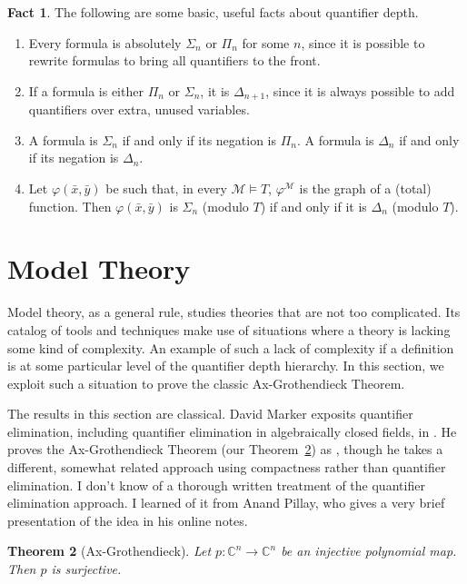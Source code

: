 \documentclass{article}
\theoremstyle{plain}
\newtheorem{thm}{Theorem}[section]
\theoremstyle{definition}
\newtheorem{fact}[thm]{Fact}
\newcommand{\tuple}{\bar}
\renewcommand{\phi}{\varphi}
\begin{document}
\begin{fact}\label{fact:qfhier-basic}
  The following are some basic, useful facts about quantifier depth.
  \begin{enumerate}
  \item Every formula is absolutely $\Sigma_n$ or $\Pi_n$ for some
    $n$, since it is possible to rewrite formulas to bring all
    quantifiers to the front.
  \item If a formula is either $\Pi_n$ or $\Sigma_n$, it is
    $\Delta_{n+1}$, since it is always possible to add quantifiers
    over extra, unused variables.
  \item A formula is $\Sigma_n$ if and only if its negation is
    $\Pi_n$. A formula is $\Delta_n$ if and only if its negation is
    $\Delta_n$.
  \item Let $\phi(\tuple{x}, \tuple{y})$ be such that, in every
    $\mathcal{M} \models T$, $\phi^\mathcal{M}$ is the graph of a
    (total) function. Then $\phi(\tuple{x},\tuple{y})$ is $\Sigma_n$
    (modulo $T$) if and only if it is $\Delta_n$ (modulo $T$).
  \end{enumerate}
\end{fact}

\section{Model Theory}

Model theory, as a general rule, studies theories that are not too
complicated. Its catalog of tools and techniques make use of
situations where a theory is lacking some kind of complexity. An
example of such a lack of complexity if a definition is at some
particular level of the quantifier depth hierarchy. In this section,
we exploit such a situation to prove the classic Ax-Grothendieck
Theorem.

The results in this section are classical. David Marker exposits
quantifier elimination, including quantifier elimination in
algebraically closed fields, in \cite[Chapter~3]{marker}. He proves
the Ax-Grothendieck Theorem (our Theorem~\ref{thm:ax-groth}) as
\cite[Theorem~2.2.11]{marker}, though he takes a different, somewhat
related approach using compactness rather than quantifier
elimination. I don't know of a thorough written treatment of the
quantifier elimination approach. I learned of it from Anand Pillay,
who gives a very brief presentation of the idea in his online
notes\cite[Corollaries 3.8 and 3.9]{anandnotes}.

\begin{thm}[Ax-Grothendieck]\label{thm:ax-groth}
  Let $p : \mathbb{C}^n \to \mathbb{C}^n$ be an injective polynomial
  map. Then $p$ is surjective.
\end{thm}
\end{document}
